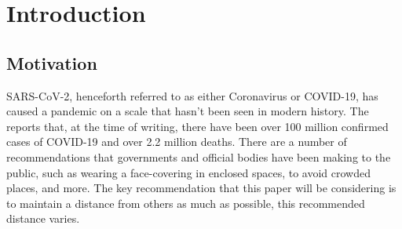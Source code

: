 \documentclass{l4proj}
\begin{document}
\tableofcontents

%
%
%
%
%
%
%
%
\chapter{Introduction}



\section{Motivation}

SARS-CoV-2, henceforth referred to as either Coronavirus or COVID-19, has caused a pandemic on a scale that hasn't been seen in modern history. The \citet{world_health_organisation_dashboard_2021} reports that, at the time of writing, there have been over 100 million confirmed cases of COVID-19 and over 2.2 million deaths. There are a number of recommendations that governments and official bodies have been making to the public, such as wearing a face-covering in enclosed spaces, to avoid crowded places, and more. The key recommendation that this paper will be considering is to maintain a distance from others as much as possible, this recommended distance varies.
\end{document}
